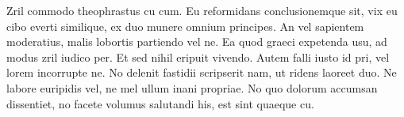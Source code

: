 Zril commodo theophrastus cu cum. Eu reformidans conclusionemque sit, vix eu cibo everti
similique, ex duo munere omnium principes. An vel sapientem moderatius, malis lobortis
partiendo vel ne. Ea quod graeci expetenda usu, ad modus zril iudico per. Et sed nihil
eripuit vivendo. Autem falli iusto id pri, vel lorem incorrupte ne. No delenit fastidii
scripserit nam, ut ridens laoreet duo. Ne labore euripidis vel, ne mel ullum inani propriae.
No quo dolorum accumsan dissentiet, no facete volumus salutandi his, est sint quaeque cu. \\

